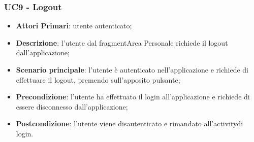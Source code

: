 \subsubsection{UC9 - Logout}
\begin{itemize}
	\item \textbf{Attori Primari}:
	utente autenticato;
	\item \textbf{Descrizione}: l'utente dal fragment\glosp Area Personale richiede il logout dall'applicazione;
	\item \textbf{Scenario principale}: l'utente è autenticato nell'applicazione e richiede di effettuare il logout, premendo sull'apposito pulsante;
	\item \textbf{Precondizione}: l'utente ha effettuato il login all'applicazione e richiede di essere disconnesso dall'applicazione;
	\item \textbf{Postcondizione}: l'utente viene disautenticato e rimandato all'activity\glosp di login. 
\end{itemize}

